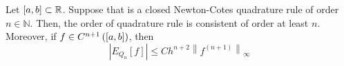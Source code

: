 \begin{frame}
    \begin{theorem}
        Let
        \begin{math}
            \left[a,b\right]\subset
            \mathbb{R}
        \end{math}.
        Suppose that is a closed Newton-Cotes quadrature rule of
        order $n\in\mathbb{N}$.
        Then, the order of quadrature rule is consistent of order at
        least $n$.
        Moreover, if $f\in C^{n+1}\left(\left[a,b\right]\right)$, then
        \begin{equation*}
            \left|
            E_{Q_{n}}
            \left[f\right]
            \right|\leq
            C
            h^{n+2}
            {\left\|f^{\left(n+1\right)}\right\|}_{\infty}
        \end{equation*}
    \end{theorem}
\end{frame}

